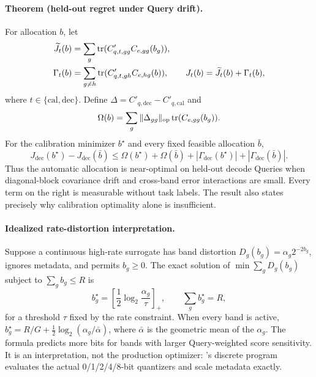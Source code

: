 \paragraph{Theorem (held-out regret under Query drift).}
For allocation $b$, let
\begin{align}
 \widetilde J_t(b)
 &=\sum_g\operatorname{tr}(C'_{q,t,gg}C_{e,gg}(b_g)),\\
 \Gamma_t(b)
 &=\sum_{g\ne h}\operatorname{tr}(C'_{q,t,gh}C_{e,hg}(b)),
 \qquad J_t(b)=\widetilde J_t(b)+\Gamma_t(b),
\end{align}
where $t\in\{\mathrm{cal},\mathrm{dec}\}$.
Define $\Delta=C'_{q,\mathrm{dec}}-C'_{q,\mathrm{cal}}$ and
\begin{equation}
 \Omega(b)=\sum_g\|\Delta_{gg}\|_{\mathrm{op}}
                    \operatorname{tr}(C_{e,gg}(b_g)).
 \label{eq:allocation-drift-penalty}
\end{equation}
For the calibration minimizer $b^\star$ and every fixed feasible allocation
$\bar b$,
\begin{equation}
 J_{\mathrm{dec}}(b^\star)-J_{\mathrm{dec}}(\bar b)
 \le \Omega(b^\star)+\Omega(\bar b)
 +|\Gamma_{\mathrm{dec}}(b^\star)|
 +|\Gamma_{\mathrm{dec}}(\bar b)|.
 \label{eq:heldout-allocation-regret}
\end{equation}
Thus the automatic allocation is near-optimal on held-out decode Queries
when diagonal-block covariance drift and cross-band error interactions are
small.  Every term on the right is measurable without task labels.  The
result also states precisely why calibration optimality alone is
insufficient.

\paragraph{Idealized rate-distortion interpretation.}
Suppose a continuous high-rate surrogate has band distortion
$D_g(b_g)=\alpha_g2^{-2b_g}$, ignores metadata, and permits $b_g\ge0$.
The exact solution of
$\min\sum_gD_g(b_g)$ subject to $\sum_gb_g\le R$ is
\begin{equation}
 b_g^\star=\left[\frac12\log_2\frac{\alpha_g}{\tau}\right]_+,
 \qquad
 \sum_g b_g^\star=R,
 \label{eq:waterfilling-bits}
\end{equation}
for a threshold $\tau$ fixed by the rate constraint.
When every band is active,
$b_g^\star=R/G+\frac12\log_2(\alpha_g/\bar\alpha)$, where
$\bar\alpha$ is the geometric mean of the $\alpha_g$.
The formula predicts more bits for bands with larger Query-weighted score
sensitivity.  It is an interpretation, not the production optimizer:
\method's discrete program evaluates the actual 0/1/2/4/8-bit quantizers and
scale metadata exactly.

